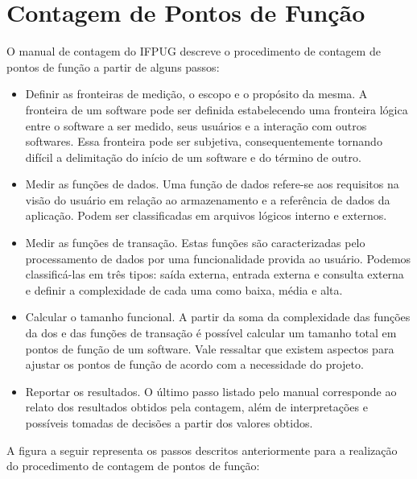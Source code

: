 \section{Contagem de Pontos de Função}

O manual de contagem do IFPUG descreve o procedimento de contagem de pontos de função a partir de alguns passos:

\begin{itemize}

\item Definir as fronteiras de medição, o escopo e o propósito da mesma. A fronteira de um software pode ser definida estabelecendo uma fronteira lógica entre o software a ser medido, seus usuários e a interação com outros softwares. Essa fronteira pode ser subjetiva, consequentemente tornando difícil a delimitação do início de um software e do término de outro.

\item Medir as funções de dados. Uma função de dados refere-se aos requisitos na visão do usuário em relação ao armazenamento e a referência de dados da aplicação. Podem ser classificadas em arquivos lógicos interno e externos.

\item Medir as funções de transação. Estas funções são caracterizadas pelo processamento de dados por uma funcionalidade provida ao usuário. Podemos classificá-las em três tipos: saída externa, entrada externa e consulta externa e definir a complexidade de cada uma como baixa, média e alta.

\item Calcular o tamanho funcional. A partir da soma da complexidade das funções da dos e das funções de transação é possível calcular um tamanho total em pontos de função de um software. Vale ressaltar que existem aspectos para ajustar os pontos de função de acordo com a necessidade do projeto.

\item Reportar os resultados. O último passo listado pelo manual corresponde ao relato dos resultados obtidos pela contagem, além de interpretações e possíveis tomadas de decisões a partir dos valores obtidos.

\end{itemize}

A figura a seguir representa os passos descritos anteriormente para a realização do procedimento de contagem de pontos de função:

